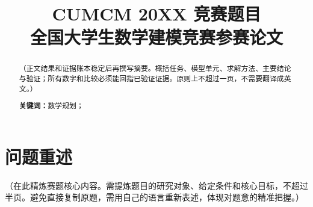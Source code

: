 \documentclass[12pt, a4paper]{article}
\title{
    \vspace{-1cm}
    {\Large \textbf{CUMCM 20XX 竞赛题目}} \\[0.5em]
    {\large 全国大学生数学建模竞赛参赛论文}
}
\author{}
\date{}
\begin{document}

\setcounter{page}{1}

\maketitle
\thispagestyle{plain}

\begin{abstract}
\noindent
（正文结果和证据账本稳定后再撰写摘要。概括任务、模型单元、求解方法、主要结论与验证；所有数字和比较必须能回指已验证证据。原则上不超过一页，不需要翻译成英文。）

\vspace{1em}
\noindent\textbf{关键词：}数学规划；%
\end{abstract}

\newpage

\section{问题重述}

（在此精炼赛题核心内容。需提炼题目的研究对象、给定条件和核心目标，不超过半页。避免直接复制原题，需用自己的语言重新表述，体现对题意的精准把握。）

\end{document}
